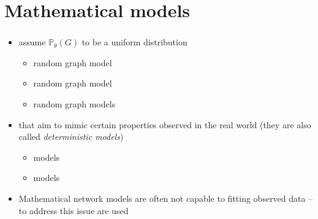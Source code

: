 \documentclass[8pt]{beamer}
\begin{document}






\section{Mathematical models}


\bgroup
{}
\begin{frame}[plain]{}
\begin{center}
\color{white}{\Huge\insertsection}
\end{center}
\end{frame}
\egroup


\begin{frame}
\frametitle{\insertsection}

\begin{itemize}
\item  {\color{blue}{Random graph models}} assume $\mathbb{P}_{\theta}(G)$ to be a uniform distribution
	\begin{itemize}
	\item {\color{blue}{Erd\'os-R\'enyi}} random graph model
	\item {\color{blue}{Bernoulli}} random graph model
	\item {\color{blue}{Generalised}} random graph models
	\end{itemize}

\medskip
\medskip

\item  {\color{blue}{Models based on mechanisms}} that aim to mimic certain properties observed in the real world (they are also called \textit{deterministic models})
	\begin{itemize}
	\item {\color{blue}{Small-worlds}} models
	\item {\color{blue}{Preferential attachment}} models
	\end{itemize}
	
\medskip
\medskip

\item Mathematical network models are often not capable to fitting observed data -- to address this issue {\color{blue}{statistical network models}} are used

\end{itemize}
\end{frame}
\end{document}
